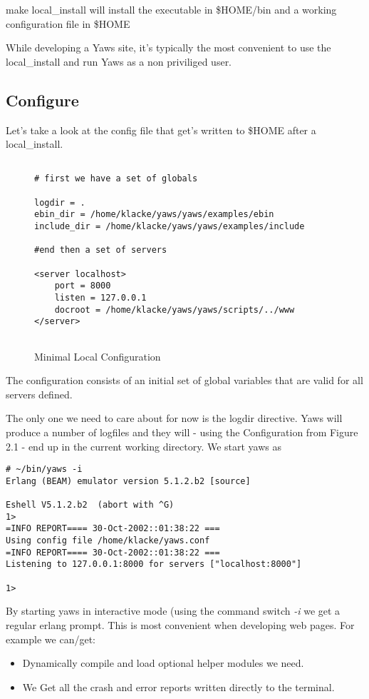 \documentclass[11pt,oneside,english]{book}
\begin{document}
make local\_install will install the executable in \$HOME/bin and a
working configuration file in \$HOME

While developing a Yaws site, it's typically the most convenient to
use the local\_install and run Yaws as a non priviliged user.


\subsection{Configure}
Let's take a look at the config file that get's written to \$HOME after
a local\_install.


\begin{figure}[h]
\begin{verbatim}

# first we have a set of globals

logdir = .
ebin_dir = /home/klacke/yaws/yaws/examples/ebin
include_dir = /home/klacke/yaws/yaws/examples/include

#end then a set of servers

<server localhost>
	port = 8000
	listen = 127.0.0.1
	docroot = /home/klacke/yaws/yaws/scripts/../www
</server>


\end{verbatim}
\caption{Minimal Local Configuration}
\end{figure}

The configuration consists of an initial set of global
variables that are valid for all servers defined.

The only one we need to care about for now is the logdir
directive. Yaws will produce a number of logfiles and they will -
using the Configuration from Figure 2.1 - end up in the current 
working directory.
We start yaws as 
\begin{verbatim}
# ~/bin/yaws -i
Erlang (BEAM) emulator version 5.1.2.b2 [source]

Eshell V5.1.2.b2  (abort with ^G)
1> 
=INFO REPORT==== 30-Oct-2002::01:38:22 ===
Using config file /home/klacke/yaws.conf
=INFO REPORT==== 30-Oct-2002::01:38:22 ===
Listening to 127.0.0.1:8000 for servers ["localhost:8000"]

1> 
\end{verbatim}

By starting yaws in interactive mode (using the command switch \textit{-i}
we get a regular erlang prompt. This is most convenient when developing
web pages. For example we can/get:
\begin{itemize}
\item{Dynamically compile and load optional helper modules we need.}
\item{We Get all the crash and error reports written directly to the
terminal.}
\end{itemize}
\end{document}
